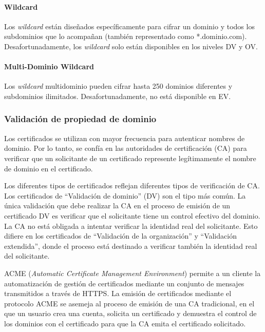   \paragraph*{Wildcard}
  
  Los \emph{wildcard} están diseñados específicamente para cifrar un dominio y 
  todos los subdominios que lo acompañan (también representado como *.dominio.com). 
  Desafortunadamente, los \emph{wildcard} solo están disponibles en los 
  niveles DV y OV.
  
  \paragraph*{Multi-Dominio Wildcard}
  Los \emph{wildcard} multidominio pueden cifrar hasta 250 dominios diferentes 
  y subdominios ilimitados. Desafortunadamente, no está disponible en EV.

  
\subsubsection*{Validación de propiedad de dominio}

Los certificados se utilizan con mayor frecuencia para autenticar 
nombres de dominio. Por lo tanto, se confía en las autoridades de 
certificación (CA) para verificar que un solicitante de un certificado 
represente legítimamente el nombre de dominio en el certificado.

Los diferentes tipos de certificados reflejan diferentes tipos de 
verificación de CA. Los certificados de “Validación de dominio” (DV) son 
el tipo más común. La única validación que debe realizar la CA en el 
proceso de emisión de un certificado DV es verificar que el solicitante 
tiene un control efectivo del dominio. La CA no está obligada a intentar 
verificar la identidad real del solicitante. Esto difiere en los certificados 
de “Validación de la organización” y “Validación extendida”, 
donde el proceso está destinado a verificar también la identidad real del 
solicitante.

ACME (\emph{Automatic Certificate Management Environment})
permite a un cliente 
la automatización de gestión de certificados 
mediante un conjunto de mensajes transmitidos a través de HTTPS. La 
emisión de certificados mediante el protocolo ACME se asemeja al proceso 
de emisión de una CA tradicional, en el que un usuario crea una cuenta, 
solicita un certificado y demuestra el control de los dominios con el 
certificado para que la CA emita el certificado solicitado.


